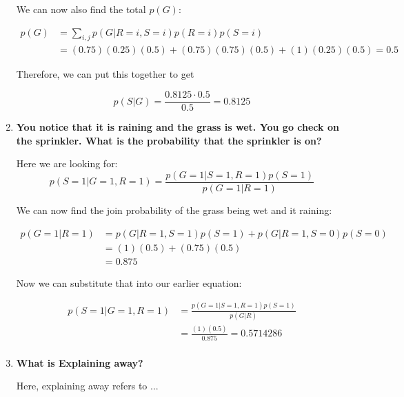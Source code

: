 \documentclass[submit]{harvardml}
\begin{document}
\begin{enumerate}
    We can now also find the total $p(G)$: 
    
    \begin{align*}
        p(G) &= \sum_{i,j} p(G| R = i, S = i)p(R=i)p(S=i) \\
        &= (0.75)(0.25)(0.5) + (0.75)(0.75)(0.5) + (1)(0.25)(0.5) = 0.5
    \end{align*}
    
    Therefore, we can put this together to get 
    
    $$
    p(S | G) = \frac{0.8125 \cdot 0.5}{0.5} = 0.8125
    $$
    
    \item \textbf{You notice that it is raining and the grass is wet. You go check on the sprinkler.  What is the probability that the sprinkler is on?}
    
    Here we are looking for: 
    $$
        p(S=1 | G = 1, R = 1) = \frac{p(G=1 | S=1, R = 1)p(S=1)}{p(G=1|R=1)}
    $$
    
    We can now find the join probability of the grass being wet and it raining:
    
    \begin{align*}
        p(G=1| R=1) &= p(G|R=1,S=1)p(S=1) + p(G|R=1,S=0)p(S=0)\\
        &= (1)(0.5) + (0.75)(0.5)\\
        &= 0.875
    \end{align*}
    
    Now we can substitute that into our earlier equation:
    
    \begin{align*}
        p(S=1 | G = 1, R = 1) &= \frac{p(G=1 | S=1, R = 1)p(S=1)}{p(G|R)} \\
        &= \frac{(1)(0.5)}{0.875} =  0.5714286\\
    \end{align*}
    
    
    \item \textbf{What is Explaining away?}
    
    Here, explaining away refers to ...
    
    
\end{enumerate}
\end{document}

